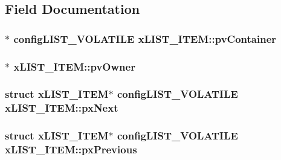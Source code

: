 \subsection{Field Documentation}
\hypertarget{structxLIST__ITEM_a341462d06236aa07eaf1a864e4b59951}{
\subsubsection[{pv\-Container}]{$\ast$ {\bf config\-L\-I\-S\-T\-\_\-\-V\-O\-L\-A\-T\-I\-L\-E} x\-L\-I\-S\-T\-\_\-\-I\-T\-E\-M\-::pv\-Container}}\label{structxLIST__ITEM_a341462d06236aa07eaf1a864e4b59951}
\hypertarget{structxLIST__ITEM_aeb3110b50fe0dbce826d929b27b5ddb1}{
\subsubsection[{pv\-Owner}]{$\ast$ x\-L\-I\-S\-T\-\_\-\-I\-T\-E\-M\-::pv\-Owner}}\label{structxLIST__ITEM_aeb3110b50fe0dbce826d929b27b5ddb1}
\hypertarget{structxLIST__ITEM_a03713c4ee953ef5ca6adbec883720c60}{
\subsubsection[{px\-Next}]{\setlength{\rightskip}{0pt plus 5cm}struct {\bf x\-L\-I\-S\-T\-\_\-\-I\-T\-E\-M}$\ast$ {\bf config\-L\-I\-S\-T\-\_\-\-V\-O\-L\-A\-T\-I\-L\-E} x\-L\-I\-S\-T\-\_\-\-I\-T\-E\-M\-::px\-Next}}\label{structxLIST__ITEM_a03713c4ee953ef5ca6adbec883720c60}
\hypertarget{structxLIST__ITEM_ae8e553eae41010a8e41c66d76c94110b}{
\subsubsection[{px\-Previous}]{\setlength{\rightskip}{0pt plus 5cm}struct {\bf x\-L\-I\-S\-T\-\_\-\-I\-T\-E\-M}$\ast$ {\bf config\-L\-I\-S\-T\-\_\-\-V\-O\-L\-A\-T\-I\-L\-E} x\-L\-I\-S\-T\-\_\-\-I\-T\-E\-M\-::px\-Previous}}\label{structxLIST__ITEM_ae8e553eae41010a8e41c66d76c94110b}
